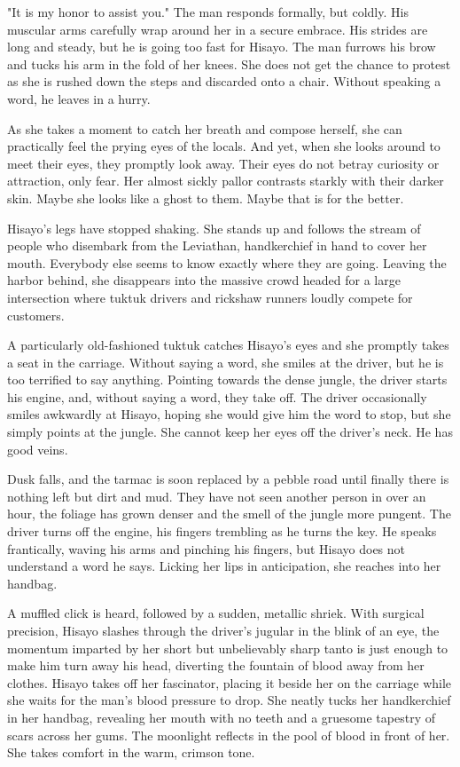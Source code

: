 "It is my honor to assist you." The man responds formally, but coldly.
His muscular arms carefully wrap around her in a secure embrace.
His strides are long and steady, but he is going too fast for Hisayo.
The man furrows his brow and tucks his arm in the fold of her knees.
She does not get the chance to protest as she is rushed down the steps and discarded onto a chair.
Without speaking a word, he leaves in a hurry.

As she takes a moment to catch her breath and compose herself, she can practically feel the prying eyes of the locals.
And yet, when she looks around to meet their eyes, they promptly look away.
Their eyes do not betray curiosity or attraction, only fear.
Her almost sickly pallor contrasts starkly with their darker skin.
Maybe she looks like a ghost to them.
Maybe that is for the better.

Hisayo's legs have stopped shaking.
She stands up and follows the stream of people who disembark from the Leviathan, handkerchief in hand to cover her mouth.
Everybody else seems to know exactly where they are going.
Leaving the harbor behind, she disappears into the massive crowd headed for a large intersection where tuktuk drivers and rickshaw runners loudly compete for customers.

A particularly old-fashioned tuktuk catches Hisayo's eyes and she promptly takes a seat in the carriage.
Without saying a word, she smiles at the driver, but he is too terrified to say anything.
Pointing towards the dense jungle, the driver starts his engine, and, without saying a word, they take off.
The driver occasionally smiles awkwardly at Hisayo, hoping she would give him the word to stop, but she simply points at the jungle.
She cannot keep her eyes off the driver's neck.
He has good veins.

Dusk falls, and the tarmac is soon replaced by a pebble road until finally there is nothing left but dirt and mud.
They have not seen another person in over an hour, the foliage has grown denser and the smell of the jungle more pungent.
The driver turns off the engine, his fingers trembling as he turns the key.
He speaks frantically, waving his arms and pinching his fingers, but Hisayo does not understand a word he says.
Licking her lips in anticipation, she reaches into her handbag.

A muffled click is heard, followed by a sudden, metallic shriek.
With surgical precision, Hisayo slashes through the driver's jugular in the blink of an eye, the momentum imparted by her short but unbelievably sharp tanto is just enough to make him turn away his head, diverting the fountain of blood away from her clothes.
Hisayo takes off her fascinator, placing it beside her on the carriage while she waits for the man's blood pressure to drop.
She neatly tucks her handkerchief in her handbag, revealing her mouth with no teeth and a gruesome tapestry of scars across her gums.
The moonlight reflects in the pool of blood in front of her.
She takes comfort in the warm, crimson tone.

